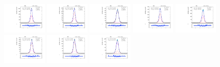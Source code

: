 \begin{figure}[htb]
\includegraphics[width=0.19\textwidth]{plots/Appendix_Recoil_Fits/ZmmData_PF_13TeV_2G_bkg/pfu1fit_8.pdf}
\includegraphics[width=0.19\textwidth]{plots/Appendix_Recoil_Fits/ZmmData_PF_13TeV_2G_bkg/pfu1fit_9.pdf}
\includegraphics[width=0.19\textwidth]{plots/Appendix_Recoil_Fits/ZmmData_PF_13TeV_2G_bkg/pfu1fit_19.pdf}
\includegraphics[width=0.19\textwidth]{plots/Appendix_Recoil_Fits/ZmmData_PF_13TeV_2G_bkg/pfu1fit_11.pdf}
\includegraphics[width=0.19\textwidth]{plots/Appendix_Recoil_Fits/ZmmData_PF_13TeV_2G_bkg/pfu1fit_12.pdf}
\includegraphics[width=0.19\textwidth]{plots/Appendix_Recoil_Fits/ZmmData_PF_13TeV_2G_bkg/pfu1fit_13.pdf}
\includegraphics[width=0.19\textwidth]{plots/Appendix_Recoil_Fits/ZmmData_PF_13TeV_2G_bkg/pfu1fit_14.pdf}
\includegraphics[width=0.19\textwidth]{plots/Appendix_Recoil_Fits/ZmmData_PF_13TeV_2G_bkg/pfu1fit_15.pdf}

\end{figure}
